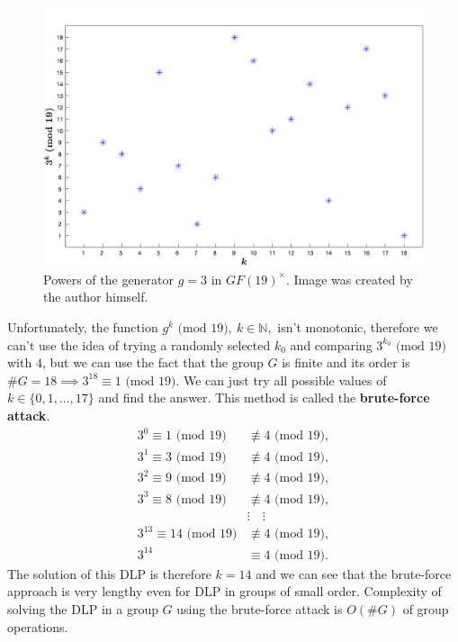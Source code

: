 \documentclass[thesis=M,english]{FITthesis}[2012/10/20]
\theoremstyle{remark}
\theoremstyle{definition}
\begin{document}
 \begin{figure}[h]
\hspace*{-2cm}
 	\includegraphics[width=1.25\textwidth]{graph3in19.png}
 	\caption[Example of the group structure of $GF(19)^\times$.]{Powers of the generator $g = 3$ in $GF(19)^\times$. Image was created by the author himself.}
 	\label{fig2}
 \end{figure}
 \newpage
\noindent Unfortunately, the function $g^k \text{ (mod 19)},\ k \in \mathbb{N},$ isn't monotonic, therefore we can't use the idea of trying a randomly selected $k_0$ and comparing $3^{k_0} \text{ (mod 19)}$ with $4$, but we can use the fact that the group $G$ is finite and its order is $\#G = 18 \implies 3^{18} \equiv 1 \text{ (mod 19)}.$ We can just try all possible values of $k \in \{0, 1, \ldots, 17\}$ and find the answer. This method is called the \textbf{brute-force attack}. 
\begin{align*}
3^0 \equiv 1 \text{ (mod 19)} &\not\equiv 4 \text{ (mod 19)}, \\
3^1 \equiv 3 \text{ (mod 19)} &\not\equiv 4 \text{ (mod 19)}, \\
3^2 \equiv 9 \text{ (mod 19)} &\not\equiv 4 \text{ (mod 19)}, \\
3^3 \equiv 8 \text{ (mod 19)} &\not\equiv 4 \text{ (mod 19)}, \\
&\vdots \quad \vdots \\
3^{13} \equiv 14 \text{ (mod 19)} &\not\equiv 4 \text{ (mod 19)}, \\
3^{14} &\equiv 4 \text{ (mod 19)}.
\end{align*}
The solution of this DLP is therefore $k = 14$ and we can see that the brute-force approach is very lengthy even for DLP in groups of small order. Complexity of solving the DLP in a group $G$ using the brute-force attack is $O(\#G)$ of group operations.
\end{document}
